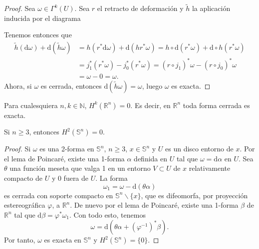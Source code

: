       \begin{proof}
	Sea $\omega \in \Gamma^k(U)$. Sea $r$ el retracto de deformación y $\tilde{h}$ la aplicación inducida por el diagrama
	\begin{center}
	 \end{center}
	 Tenemos entonces que 
	 \begin{align*}
	   \tilde{h}(\mathrm{d}\omega)+\mathrm{d}(\tilde{h}\omega)&=h(r^*\mathrm{d}\omega)+\mathrm{d}(hr^*\omega)=h\circ \mathrm{d}(r^*\omega)+\mathrm{d}\circ h(r^*\omega)\\
	   &= j_1^*(r^*\omega)-j_0^*(r^*\omega)=(r\circ j_1)^*\omega - (r\circ j_0)^* \omega\\& = \omega - 0 = \omega.
	 \end{align*}
	 Ahora, si $\omega$ es cerrada, entonces $\mathrm{d}(\tilde{h}\omega)=\omega$, luego $\omega$ es exacta.
      \end{proof}

      \begin{corol}
	Para cualesquiera $n, k \in \mathbb{N} $, $H^k(\mathbb{R} ^n)=0$. Es decir, en $\mathbb{R}^n$ toda forma cerrada es exacta.
      \end{corol}

 \begin{corol}
   Si $n\geq 3$, entonces $H^2(\mathbb{S}^n)={0}$.
\end{corol}

\begin{proof}
  Si $\omega$ es una 2-forma en $\mathbb{S}^n$, $n\geq 3$, $x\in \mathbb{S}^n$ y $U$ es un disco entorno de $x$. Por el lema de Poincaré, existe una 1-forma $\alpha$ definida en $U$ tal que $\omega=\mathrm{d} \alpha$ en $U$. Sea $\theta$ una función meseta que valga 1 en un entorno $V\subset U$ de $x$ relativamente compacto de $U$ y $0$ fuera de $U$. La forma 
  \begin{equation*}
    \omega_1=\omega - \mathrm{d}(\theta \alpha)
  \end{equation*}
  es cerrada con soporte compacto en $\mathbb{S}^n \backslash \{x\}$, que es difeomorfa, por proyección estereográfica $\varphi$, a $\mathbb{R} ^n$. De nuevo por el lema de Poincaré, existe una 1-forma $\beta$ de $\mathbb{R} ^n$ tal que $\mathrm{d} \beta = \varphi^* \omega_1$. Con todo esto, tenemos
  \begin{equation*}
    \omega=\mathrm{d}\left(\theta \alpha + \left( \varphi^{-1} \right)^* \beta \right) .
  \end{equation*}
  Por tanto, $\omega$ es exacta en $\mathbb{S}^n$ y 
$    H^2(\mathbb{S}^n)= \{0\}$.
\end{proof}

